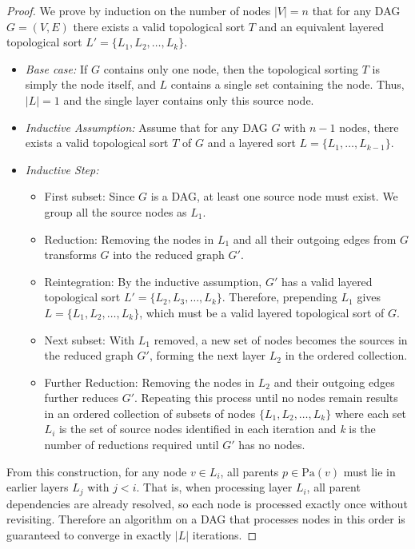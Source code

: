 \documentclass[12pt]{report}
\begin{document}
\begin{proof}
We prove by induction on the number of nodes $|V| = n$ that for any DAG $G = (V, E)$ there exists a valid topological sort $T$ and an equivalent layered topological sort $L' = \{L_1, L_2, \ldots, L_k\}$.

\begin{itemize}
    \item \textit{Base case:} If $G$ contains only one node, then the topological sorting $T$ is simply the node itself, and $L$ contains a single set containing the node. Thus, $|L| = 1$ and the single layer contains only this source node.
    \item \textit{Inductive Assumption:} Assume that for any DAG $G$ with $n-1$ nodes, there exists a valid topological sort $T$ of $G$ and a layered sort $L = \{L_1, \ldots,  L_{k-1}\}$.
    \item \textit{Inductive Step:} 
    \begin{itemize}
        \item First subset: Since $G$ is a DAG, at least one source node must exist. We group all the source nodes as $L_1$.         
        \item Reduction: Removing the nodes in $L_1$ and all their outgoing edges from $G$ transforms $G$ into the  reduced graph $G'$. 
        \item Reintegration: By the inductive assumption, $G'$ has a valid layered topological sort $L' = \{L_2, L_3, \ldots, L_k\}$. Therefore, prepending $L_1$ gives $L = \{L_1, L_2, \ldots, L_k\}$, which must be a valid layered topological sort of $G$.
        \item Next subset: With $L_1$ removed, a new set of nodes becomes the sources in the reduced graph $G'$, forming the next layer $L_2$ in the ordered collection.
        \item Further Reduction: Removing the nodes in $L_2$ and their outgoing edges further reduces  $G'$. Repeating this process until no nodes remain results in an ordered collection of subsets of nodes $\{L_1, L_2, \ldots, L_k\}$ where each set  $L_i$ is the set of source nodes identified in each iteration and \textit{k} is the number of reductions required until $G'$ has no nodes. 
    \end{itemize}
\end{itemize}

From this construction, for any node $v \in L_i$, all parents $p \in \text{Pa}(v)$ must lie in earlier layers $L_j$ with $j < i$. That is, when processing layer $L_i$, all parent dependencies are already resolved, so each node is processed exactly once without revisiting. Therefore an algorithm on a DAG that processes nodes in this order is guaranteed to converge in exactly $|L|$ iterations.
\end{proof}
\end{document}
